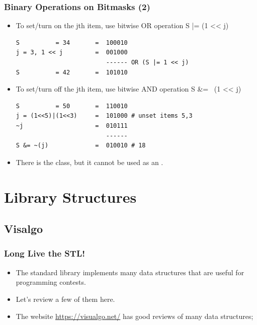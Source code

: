 \documentclass{beamer}
\begin{document}
\begin{frame}[fragile]
  \frametitle{Binary Operations on Bitmasks (2)}
  {\smaller
  \begin{itemize}
  \item To set/turn on the jth item, use bitwise OR operation S |= (1 << j)
\begin{verbatim}
S          = 34       =  100010
j = 3, 1 << j         =  001000
                         ------ OR (S |= 1 << j)
S          = 42       =  101010
\end{verbatim}
\item To set/turn off the jth item, use bitwise AND operation S \&= ~(1 << j)
\begin{verbatim}
S          = 50       =  110010
j = (1<<5)|(1<<3)     =  101000 # unset items 5,3
~j                    =  010111
                         ------
S &= ~(j)             =  010010 # 18
\end{verbatim}
\bigskip

\item There is the  class, but it cannot be used as an
.

  \end{itemize}

  }
\end{frame}



\section{Library Structures}

\subsection{Visalgo}
\begin{frame}
  \frametitle{Long Live the STL!}

  \begin{itemize}
    \item The standard library implements many data structures that are
      useful for programming contests.
      \bigskip

    \item Let's review a few of them here.
      \bigskip

    \item The website \url{https://visualgo.net/} has good reviews of many
     data structures;
  \end{itemize}

\end{frame}
\end{document}
